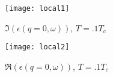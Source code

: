\documentclass[11pt]{article}
\begin{document}
	\begin{figure}[htp]
		\centering
		\texttt{[image: local1]}
		\caption{$\Im(\epsilon(q = 0, \omega))$, $T = .1 T_c$} \label{fig:loc1}
	\end{figure}
	\begin{figure}[htp]
		\centering
		\texttt{[image: local2]}
		\caption{$\Re(\epsilon(q = 0, \omega))$, $T = .1 T_c$} \label{fig:loc2}
	\end{figure}

	\newpage
	\printbibliography
\end{document}
